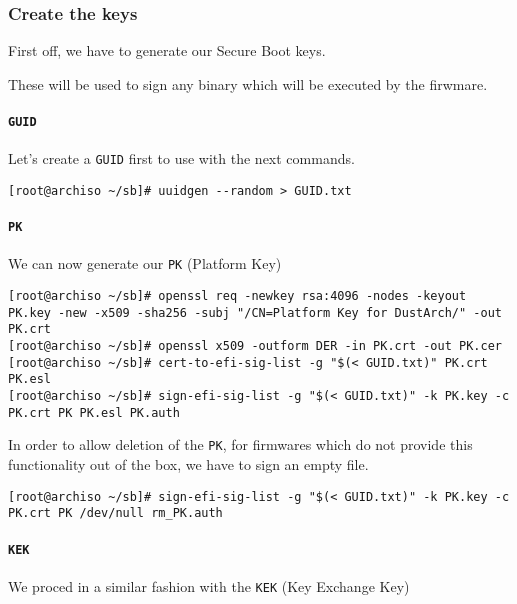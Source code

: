 \documentclass[10pt]{dustdoc}
\begin{document}
\subsubsection{Create the keys}
\label{sec:create-the-keys}

First off, we have to generate our Secure Boot keys.

These will be used to sign any binary which will be executed by the firwmare.

\paragraph{\texttt{GUID}}
\label{par:guid}

Let’s create a \texttt{GUID} first to use with the next commands.

\begin{verbatim}
[root@archiso ~/sb]# uuidgen --random > GUID.txt
\end{verbatim}

\paragraph{\texttt{PK}}
\label{par:pk}

We can now generate our \texttt{PK} (Platform Key)

\begin{verbatim}
[root@archiso ~/sb]# openssl req -newkey rsa:4096 -nodes -keyout PK.key -new -x509 -sha256 -subj "/CN=Platform Key for DustArch/" -out PK.crt
[root@archiso ~/sb]# openssl x509 -outform DER -in PK.crt -out PK.cer
[root@archiso ~/sb]# cert-to-efi-sig-list -g "$(< GUID.txt)" PK.crt PK.esl
[root@archiso ~/sb]# sign-efi-sig-list -g "$(< GUID.txt)" -k PK.key -c PK.crt PK PK.esl PK.auth
\end{verbatim}

In order to allow deletion of the \texttt{PK}, for firmwares which do not provide this functionality out of the box, we have to sign an empty file.

\begin{verbatim}
[root@archiso ~/sb]# sign-efi-sig-list -g "$(< GUID.txt)" -k PK.key -c PK.crt PK /dev/null rm_PK.auth
\end{verbatim}

\paragraph{\texttt{KEK}}
\label{par:kek}

We proced in a similar fashion with the \texttt{KEK} (Key Exchange Key)
\end{document}
